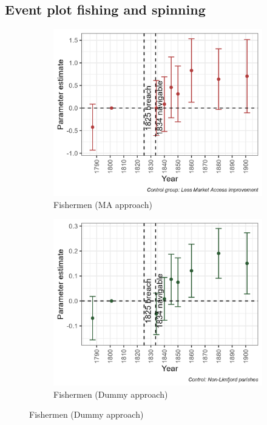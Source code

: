 \subsection{Event plot fishing and spinning}
\begin{figure}[h!]
    \centering
    \caption{Fishermen and Spinners, Weavers, Knitters, Dyers And Related Workers}
    \begin{subfigure}[b]{0.45\textwidth}
        \centering
        \caption{\label{fig:migr} Fishermen (MA approach)}
        \includegraphics[width=\textwidth]{Plots/Mechanism/fish_MA.png}
    \end{subfigure}
    \hfill
    \begin{subfigure}[b]{0.45\textwidth}
        \centering
        \caption{\label{fig:fert} Fishermen (Dummy approach)}
        \includegraphics[width=\textwidth]{Plots/Mechanism/fish_dummy.png}

\end{subfigure}
\end{figure}
